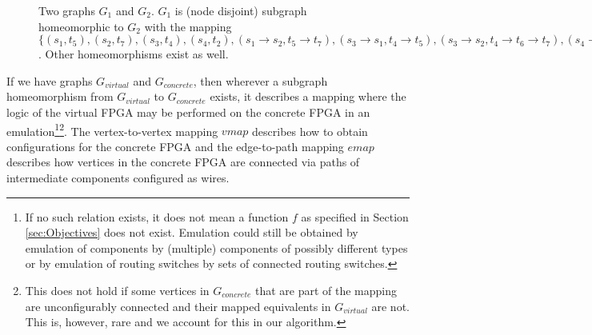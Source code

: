 \begin{figure}
\centering
\parbox{1.2in}{

}
\qquad\qquad
\begin{minipage}{1.2in}%

\end{minipage}
\caption{Two graphs $G_1$ and $G_2$. $G_1$ is (node disjoint) subgraph homeomorphic to $G_2$ with the mapping $\{(s_1, t_5), (s_2, t_7), (s_3, t_4), (s_4, t_2), (s_1 \to s_2, t_5 \to t_7), (s_3 \to s_1, t_4 \to t_5), (s_3 \to s_2, t_4 \to t_6 \to t_7), (s_4 \to s_3, t_2 \to t_3 \to t_4)\}$. Other homeomorphisms exist as well.}
\end{figure}

If we have graphs $G_{virtual}$ and $G_{concrete}$, then wherever a subgraph homeomorphism from $G_{virtual}$ to $G_{concrete}$ exists, it describes a mapping where the logic of the virtual FPGA may be performed on the concrete FPGA in an emulation\footnote{If no such relation exists, it does not mean a function $f$ as specified in Section \ref{sec:Objectives} does not exist. Emulation could still be obtained by emulation of components by (multiple) components of possibly different types or by emulation of routing switches by sets of connected routing switches.}\footnote{This does not hold if some vertices in $G_{concrete}$ that are part of the mapping are unconfigurably connected and their mapped equivalents in $G_{virtual}$ are not. This is, however, rare and we account for this in our algorithm.}. The vertex-to-vertex mapping $\mathit{vmap}$ describes how to obtain configurations for the concrete FPGA and the edge-to-path mapping $\mathit{emap}$ describes how vertices in the concrete FPGA are connected via paths of intermediate components configured as wires.


